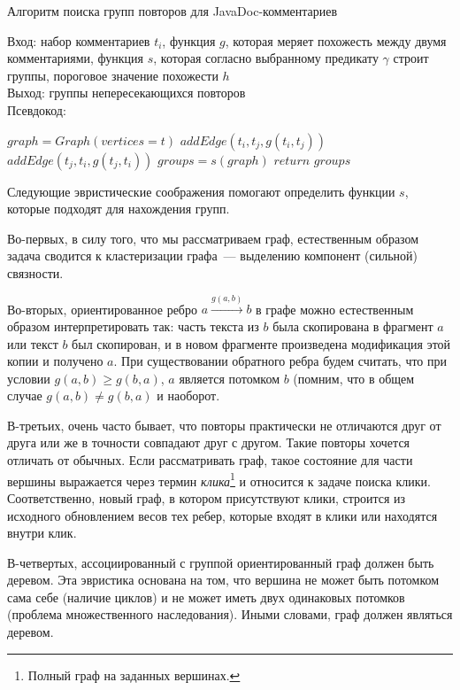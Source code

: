 \begin{algorithm}[t!]
\caption{Алгоритм поиска групп повторов для JavaDoc-комментариев}\label{alg:groupDuplicate}
Вход: набор комментариев $t_{i}$, функция $g$, которая меряет похожесть между двумя комментариями, функция $s$, которая согласно выбранному предикату $\gamma$ строит группы, пороговое значение похожести $h$\\
Выход: группы непересекающихся повторов\\
Псевдокод:
\begin{algorithmic}[1]
\State $graph = Graph(vertices=t)$
\State $addEdge(t_{i},t_{j},g(t_{i},t_{j}))$
\EndIf
{}
\State $addEdge(t_{j},t_{i},g(t_{j},t_{i}))$
\EndIf
\EndFor
\EndFor
\State $groups = s(graph)$
\State $return$ $groups$
\end{algorithmic}
\end{algorithm}


Следующие эвристические соображения помогают определить функции $s$, которые подходят для нахождения групп.

Во-первых, в силу того, что мы рассматриваем граф, естественным образом задача сводится к кластеризации графа~--- выделению компонент (сильной) связности.

Во-вторых, ориентированное ребро $a \xrightarrow{g(a,b)} b$ в графе можно естественным образом интерпретировать так: часть текста из $b$ была скопирована в фрагмент $a$ или текст $b$ был скопирован, и в новом фрагменте произведена модификация этой копии и получено $a$.
При существовании обратного ребра будем считать, что при условии $g(a,b)\geq g(b,a)$, $a$ является потомком $b$ (помним, что в общем случае $g(a,b)\neq g(b,a)$ и наоборот.

В-третьих, очень часто бывает, что повторы практически не отличаются друг от друга или же в точности совпадают друг с другом.
Такие повторы хочется отличать от обычных.
Если рассматривать граф, такое состояние для части вершины выражается через термин \emph{клика}\footnote{Полный граф на заданных вершинах.} и относится к задаче поиска клики.
Соответственно, новый граф, в котором присутствуют клики, строится из исходного обновлением весов тех ребер, которые входят в клики или находятся внутри клик.

В-четвертых, ассоциированный с группой ориентированный граф должен быть деревом.
Эта эвристика основана на том, что вершина не может быть потомком сама себе (наличие циклов) и не может иметь двух одинаковых потомков (проблема множественного наследования).
Иными словами, граф должен являться деревом.

